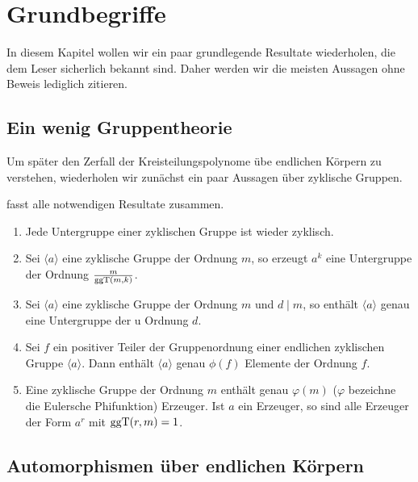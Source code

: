 \chapter{Grundbegriffe}
\label{chap:grundbegriffe}

In diesem Kapitel wollen wir ein paar grundlegende Resultate wiederholen, die
dem Leser sicherlich bekannt sind. Daher werden wir die meisten Aussagen ohne
Beweis lediglich zitieren.

\section{Ein wenig Gruppentheorie}

Um später den Zerfall der Kreisteilungspolynome übe endlichen Körpern zu
verstehen, wiederholen wir zunächst ein paar Aussagen über zyklische Gruppen.

\autocite[Theorem 1.15]{lidl1997finite} fasst alle notwendigen Resultate
zusammen.

\begin{satz}
  \label{satz:zykl_gruppen}
  \begin{enumerate}
    \item Jede Untergruppe einer zyklischen Gruppe ist wieder zyklisch.
    \item Sei $\langle a \rangle$ eine zyklische Gruppe der Ordnung $m$,
      so erzeugt $a^k$ eine Untergruppe der Ordnung $\frac{m}{\operatorname{ggT}(m,k)}$.
    \item Sei $\langle a\rangle$ eine zyklische Gruppe der Ordnung $m$ und
      $d \mid m$, so enthält $\langle a \rangle$ genau eine Untergruppe der
  u    Ordnung $d$.
     \item Sei $f$ ein positiver Teiler der Gruppenordnung einer endlichen
        zyklischen Gruppe $\langle a \rangle$. Dann enthält $\langle a \rangle$
        genau $\phi(f)$ Elemente der Ordnung $f$.
     \item Eine zyklische Gruppe der Ordnung $m$ enthält genau $\varphi(m)$
        ($\varphi$ bezeichne die Eulersche Phifunktion)
        Erzeuger. Ist $a$ ein Erzeuger, so sind alle Erzeuger der Form
        $a^r$ mit $\operatorname{ggT}(r,m) = 1$.
  \end{enumerate}
\end{satz}

\section{Automorphismen über endlichen Körpern}

